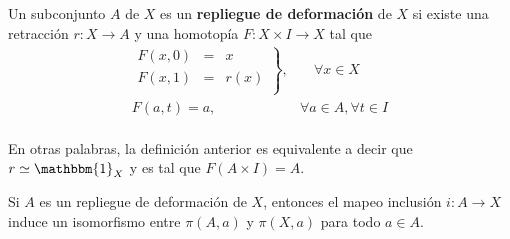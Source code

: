 \documentclass[12pt]{report}
\theoremstyle{largebreak}
\newcommand\cf[3]{\ensuremath{#1:#2\rightarrow#3}}
\newcommand{\bbm}[1]{\ensuremath{\mathbbm{#1}}}
\begin{document}
    \begin{mydef}
        Un subconjunto $A$ de $X$ es un \textbf{repliegue de deformación} de $X$ si existe una retracción $\cf{r}{X}{A}$ y una homotopía $\cf{F}{X\times I}{X}$ tal que
        \begin{equation*}
            \begin{split}
                \left.
                \begin{array}{rcl}
                    F(x,0) & = & x\\
                    F(x,1) & = & r(x)\\
                \end{array}
            \right\}, & \quad\forall x\in X\\
            F(a,t)=a,\quad&\forall a\in A, \forall t\in I\\
            \end{split}
        \end{equation*}
    \end{mydef}

    En otras palabras, la definición anterior es equivalente a decir que $r\simeq \bbm{1}_X$ y es tal que $F(A\times I)=A$.
    
    \begin{theor}
        Si $A$ es un repliegue de deformación de $X$, entonces el mapeo inclusión $\cf{i}{A}{X}$ induce un isomorfismo entre $\pi(A,a)$ y $\pi(X,a)$ para todo $a\in A$.
    \end{theor}
\end{document}
